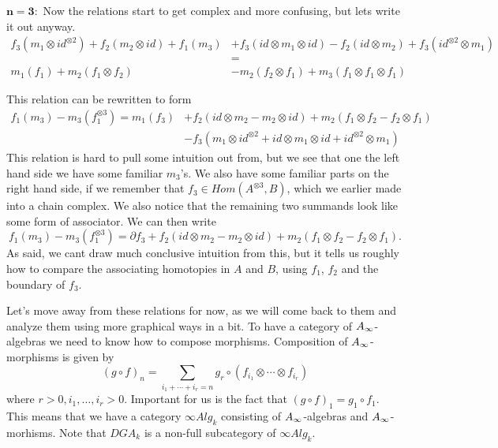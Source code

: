 $\mathbf{n=3 :}$ Now the relations start to get complex and more confusing, but lets write it out anyway. 
\begin{align*}
    f_3(m_1\otimes id^{\otimes 2})
    +f_2(m_2\otimes id)
    +f_1(m_3)
    &+f_3(id\otimes m_1\otimes id)
    -f_2(id\otimes m_2)
    +f_3(id^{\otimes 2}\otimes m_1) \\
    &= \\
    m_1(f_1)
    +m_2(f_1\otimes f_2) 
    &-m_2(f_2\otimes f_1)
    +m_3(f_1\otimes f_1\otimes f_1)
\end{align*}

This relation can be rewritten to form 
\begin{align*}
    f_1(m_3)
    -m_3(f_1^{\otimes 3})
    = 
    m_1(f_3)
    &+f_2(id\otimes m_2-m_2\otimes id)
    +m_2(f_1\otimes f_2 - f_2\otimes f_1) \\
    &-f_3(m_1\otimes id^{\otimes 2}+id\otimes m_1\otimes id+id^{\otimes 2}\otimes m_1)
\end{align*}
This relation is hard to pull some intuition out from, but we see that one the left hand side we have some familiar $m_3$'s. We also have some familiar parts on the right hand side, if we remember that $f_3\in Hom(A^{\otimes 3}, B)$, which we earlier made into a chain complex. We also notice that the remaining two summands look like some form of associator. We can then write
\begin{equation*}
    f_1(m_3)-m_3(f_1^{\otimes 3}) = \partial f_3 + f_2(id\otimes m_2-m_2\otimes id)
    +m_2(f_1\otimes f_2 - f_2\otimes f_1).
\end{equation*}
As said, we cant draw much conclusive intuition from this, but it tells us roughly how to compare the associating homotopies in $A$ and $B$, using $f_1$, $f_2$ and the boundary of $f_3$.  

Let's move away from these relations for now, as we will come back to them and analyze them using more graphical ways in a bit. To have a category of $A_{\infty}$-algebras we need to know how to compose morphisms. Composition of $A_{\infty}$-morphisms is given by 
\begin{equation*}
    (g\circ f)_n = \sum_{i_1+\cdots + i_r = n}g_r\circ (f_{i_1}\otimes \cdots \otimes f_{i_r})
\end{equation*}
where $r>0, i_1, \ldots, i_r>0$. Important for us is the fact that $(g\circ f)_1 = g_1\circ f_1$. This means that we have a category $\infty Alg_k$ consisting of $A_{\infty}$-algebras and $A_{\infty}$-morhisms. Note that $DGA_k$ is a non-full subcategory of $\infty Alg_k$. 

